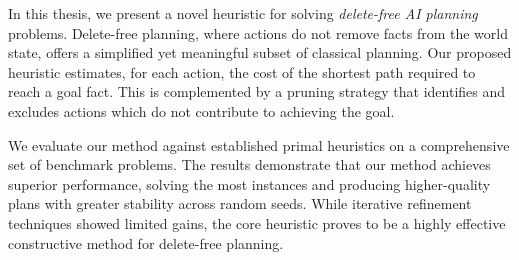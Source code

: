 In this thesis, we present a novel heuristic for solving \textit{delete-free AI planning} problems.
Delete-free planning, where actions do not remove facts from the world state, offers a simplified
yet meaningful subset of classical planning. Our proposed heuristic estimates, for each action,
the cost of the shortest path required to reach a goal fact. This is complemented by a pruning
strategy that identifies and excludes actions which do not contribute to achieving the goal.

We evaluate our method against established primal heuristics on a comprehensive set of benchmark problems.
The results demonstrate that our method achieves superior performance, solving the most instances and producing
higher-quality plans with greater stability across random seeds. While iterative refinement techniques
showed limited gains, the core heuristic proves to be a highly effective constructive method for delete-free
planning.
